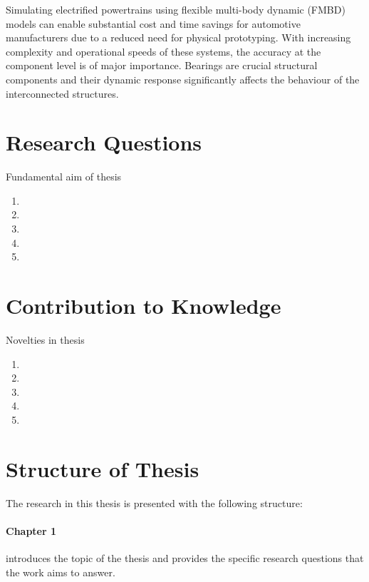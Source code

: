 Simulating electrified powertrains using flexible multi-body dynamic (FMBD) models can enable substantial cost and time savings for automotive manufacturers due to a reduced need for physical prototyping. With increasing complexity and operational speeds of these systems, the accuracy at the component level is of major importance. Bearings are crucial structural components and their dynamic response significantly affects the behaviour of the interconnected structures.




\section{Research Questions} \label{Research Questions}

Fundamental aim of thesis

\begin{enumerate}
	\item
	\item
	\item
	\item
	\item
\end{enumerate}

\section{Contribution to Knowledge} \label{Contribution to Knowledge}

Novelties in thesis

\begin{enumerate}
	\item
	\item
	\item
	\item
	\item
\end{enumerate}


\section{Structure of Thesis} \label{Structure of Thesis}

The research in this thesis is presented with the following structure:

\paragraph{Chapter 1} introduces the topic of the thesis and provides the specific research questions that the work aims to answer.

